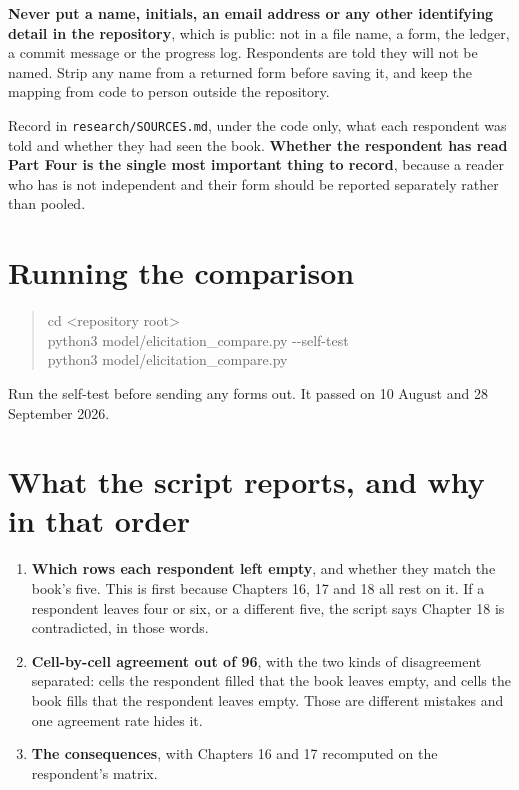 \documentclass[11pt]{article}
\begin{document}
\textbf{Never put a name, initials, an email address or any other identifying detail in the
repository}, which is public: not in a file name, a form, the ledger, a commit message or the
progress log. Respondents are told they will not be named. Strip any name from a returned form
before saving it, and keep the mapping from code to person outside the repository.

Record in \texttt{research/SOURCES.md}, under the code only, what each respondent was told and
whether they had seen the book. \textbf{Whether the respondent has read Part Four is the single most
important thing to record}, because a reader who has is not independent and their form should be
reported separately rather than pooled.

\section{Running the comparison}

\begin{quote}\ttfamily\small
cd <repository root>\\
python3 model/elicitation\_compare.py -{}-self-test\\
python3 model/elicitation\_compare.py
\end{quote}

Run the self-test before sending any forms out. It passed on 10 August and 28 September 2026.

\section{What the script reports, and why in that order}

\begin{enumerate}[leftmargin=*,itemsep=5pt]
\item \textbf{Which rows each respondent left empty}, and whether they match the book's five. This
      is first because Chapters 16, 17 and 18 all rest on it. If a respondent leaves four or six,
      or a different five, the script says Chapter 18 is contradicted, in those words.
\item \textbf{Cell-by-cell agreement out of 96}, with the two kinds of disagreement separated:
      cells the respondent filled that the book leaves empty, and cells the book fills that the
      respondent leaves empty. Those are different mistakes and one agreement rate hides it.
\item \textbf{The consequences}, with Chapters 16 and 17 recomputed on the respondent's matrix.
\end{enumerate}
\end{document}
